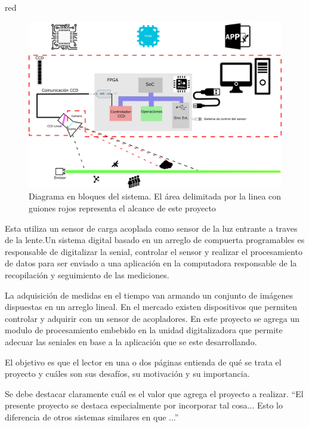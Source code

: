 \documentclass[
11pt, %
codirector, %
]{charter}
\begin{document}
\begin{consigna}{red}
\begin{figure}[htpb]
\centering 
\includegraphics[width=.9\textwidth]{./Figuras/esquema_png.png}
\caption{Diagrama en bloques del sistema. El área delimitada por la linea con guiones rojos representa el alcance de este proyecto}
\label{fig:diagBloques}
\end{figure}

\vspace{25px}

Esta utiliza un sensor de carga acoplada como sensor de la luz entrante a traves de la lente.Un sistema digital basado en un arreglo de compuerta programables es responsable de digitalizar la senial, controlar el sensor y realizar el procesamiento de datos para ser enviado a una aplicación en la computadora responsable de la recopilación y seguimiento de las mediciones. 

La adquisición de medidas en el tiempo van armando un conjunto de imágenes dispuestas en un arreglo lineal. En el mercado existen dispositivos que permiten controlar y adquirir con un sensor de acopladores. En este proyecto se agrega un modulo de procesamiento embebido en la unidad digitalizadora que permite adecuar las seniales en base a la aplicación que se este desarrollando. 













El objetivo es que el lector en una o dos páginas entienda de qué se trata el proyecto y cuáles son sus desafíos, su motivación y su importancia.

Se debe destacar claramente cuál es el valor que agrega el proyecto a realizar. ``El presente proyecto se destaca especialmente por incorporar tal cosa... Esto lo diferencia de otros sistemas similares en que ...''


\end{consigna}
\end{document}
